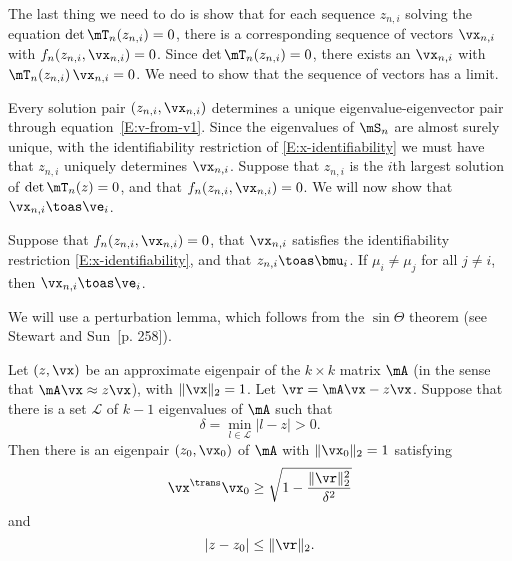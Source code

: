 The last thing we need to do is show that for each sequence
$z_{n,i}$ solving the equation $\det \mT_n(z_{n,i}) = 0$, there is a corresponding sequence
of vectors $\vx_{n,i}$ with $f_n(z_{n,i}, \vx_{n,i}) = 0$.  Since $\det \mT_n (z_{n,i}) = 0$, there exists an $\vx_{n,i}$ with 
$\mT_{n} (z_{n,i}) \, \vx_{n,i} = 0$.  We need to show that the sequence of vectors has a limit.

Every solution pair $(z_{n,i}, \vx_{n,i})$ determines a unique
eigenvalue-eigenvector pair through equation~\eqref{E:v-from-v1}.  Since the eigenvalues of $\mS_n$ are almost surely unique, with
the identifiability restriction of \eqref{E:x-identifiability} we must have that $z_{n,i}$ uniquely determines $\vx_{n,i}$.  Suppose that $z_{n,i}$ is the $i$th largest solution of $\det \mT_n(z) = 0$, and that $f_n( z_{n,i}, \vx_{n,i}) = 0$.  We will now show that $\vx_{n,i} \toas \ve_i$.

\begin{lemma}\label{L:xn-converges}
    Suppose that $f_n(z_{n,i}, \vx_{n,i}) = 0$, that $\vx_{n,i}$ satisfies the 
    identifiability restriction \eqref{E:x-identifiability}, and that
    $z_{n,i} \toas \bmu_i$.
    If $\mu_i \neq \mu_j$ for all $j \neq i$, then $\vx_{n,i} \toas \ve_i$.
\end{lemma}

We will use a perturbation lemma, which follows from the $\sin \Theta$ theorem (see Stewart and Sun~\cite{stewart1990mpt}[p. 258]).

\begin{lemma}\label{L:approx-eigenpair}
    Let $(z,\vx)$ be an approximate eigenpair of the $k\times k$
    matrix $\mA$ (in the sense that $\mA \vx \approx z \vx$), with 
    $\| \vx \|_2 = 1$.  Let $\vr = \mA \vx - z \vx$.
    Suppose that there is a set $\mathcal{L}$ of $k-1$ eigenvalues of $\mA$ 
    such that
    \[
        \delta = \min_{l \in \mathcal{L}} | l - z | > 0.
    \]
    Then there is an eigenpair $(z_0, \vx_0)$ of $\mA$ with 
    $\| \vx_0 \|_2 = 1$ satisfying
    \[
        \vx^\trans \vx_0
            \geq
                \sqrt{ 1 - \frac{\|\vr\|_2^2}{ \delta^2 } }
    \]
    and
    \[
        | z - z_0 |
            \leq \| \vr \|_2.
    \]
\end{lemma}


